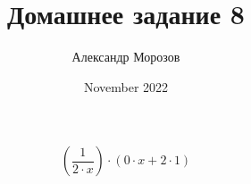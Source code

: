 \documentclass{article}
\title{Домашнее задание 8}
\author{Александр Морозов}
\date{November 2022}
\begin{document}
    \[{({\frac{{1}}{{{2}\cdot{x}}}})\cdot({{{0}\cdot{x}}+{{2}\cdot{1}}})}\]

	
\end{document}

